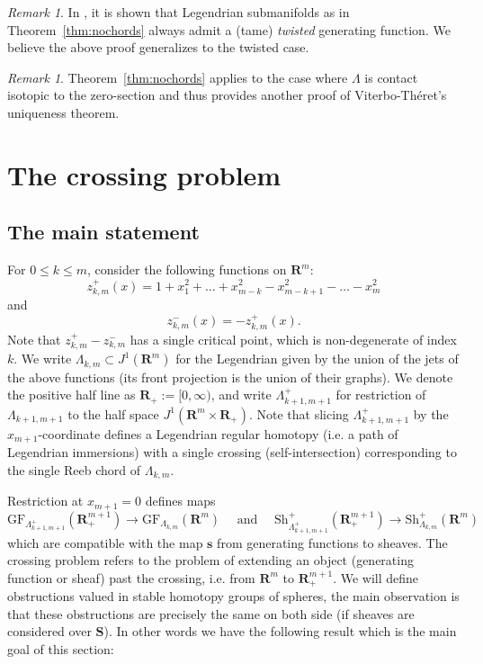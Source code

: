 \documentclass[12pt,a4paper]{article}
\numberwithin{equation}{section}
\theoremstyle{definition}
\theoremstyle{remark}
\newtheorem{rem}[equation]{Remark}
\newcommand{\R}{\mathbf{R}}
\newcommand{\s}{\mathbf{s}}
\newcommand{\Sh}{\mathrm{Sh}}
\renewcommand{\S}{\mathbf{S}}
\newcommand{\GF}{\mathrm{GF}}
\begin{document}
\begin{rem}
In \cite{ACGK}, it is shown that Legendrian submanifolds as in Theorem~\ref{thm:nochords} always admit
a (tame) \emph{twisted} generating function. We believe the above proof generalizes to the twisted case.
\end{rem}


\begin{rem}
Theorem~\ref{thm:nochords} applies to the case where $\Lambda$ is contact isotopic to the zero-section and thus provides
another proof of Viterbo-Théret's uniqueness theorem.
\end{rem}

\section{The crossing problem}\label{sec:crossing}
\subsection{The main statement}
For $0\leq k \leq m$,  consider the following functions on $\R^m$:
\[z_{k, m}^+(x)=1+x_1^2+\dots+x_{m-k}^2-x_{m-k+1}^2-\dots-x_m^2\]
and
\[z_{k,m}^-(x)=- z_{k, m}^+(x).\]
Note that $z_{k,m}^+-z_{k,m}^-$ has a single critical point, which is non-degenerate of index $k$.
We write $\Lambda_{k,m}\subset J^1(\R^m)$ for the Legendrian given by the union of the jets of the above functions (its front projection is the union of their graphs).
We denote the positive half line as $\R_+ := [0, \infty)$, and write $\Lambda_{k+1,m+1}^+$ for restriction of $\Lambda_{k+1,m+1}$ to the half space $J^1(\R^m \times \R_+)$.
Note that slicing $\Lambda_{k+1,m+1}^+$ by the $x_{m+1}$-coordinate defines a Legendrian regular homotopy (i.e. a path of Legendrian immersions) with a single crossing (self-intersection)
corresponding to the single Reeb chord of $\Lambda_{k,m}$.

Restriction at $x_{m+1}=0$ defines maps
\[\GF_{\Lambda_{k+1,m+1}^+}(\R^{m+1}_+)\to \GF_{\Lambda_{k,m}}(\R^m) \quad\text{ and }\quad \Sh^+_{\Lambda_{k+1,m+1}^+}(\R^{m+1}_+)\to \Sh^+_{\Lambda_{k,m}}(\R^m)\]
which are compatible with the map $\s$ from generating functions to sheaves. The crossing problem refers
to the problem of extending an object (generating function or sheaf) past the crossing, i.e. from $\R^m$ to $\R^{m+1}_+$.
We will define obstructions valued in stable homotopy groups of spheres, the main observation is that
these obstructions are precisely the same on both side (if sheaves are considered over $\S$). In other words we have the following result which is the main goal of this section:
\end{document}
